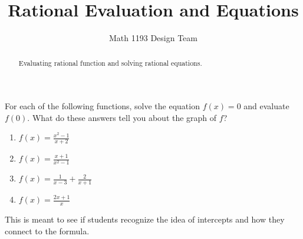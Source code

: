 \documentclass[noauthor]{ximera}
\title{Rational Evaluation and Equations}
\author{Math 1193 Design Team}
\begin{document}
\begin{abstract}
    Evaluating rational function and solving rational equations.
\end{abstract}
\maketitle

For each of the following functions, solve the equation \(f(x) = 0\)
and evaluate \(f(0)\). What do these answers tell you about the graph 
of \(f\)?

\begin{enumerate}
    \item \(f(x) = \frac{x^2 - 1}{x + 2}\)
    \item \(f(x) = \frac{x + 1}{x^2 - 1}\)
    \item \(f(x) = \frac{1}{x - 3} + \frac{2}{x + 1}\)
    \item \(f(x) = \frac{2x + 1}{x}\)
\end{enumerate}

\begin{instructorNotes}
This is meant to see if students recognize the idea of intercepts and how
they connect to the formula.
\end{instructorNotes}
\end{document}
